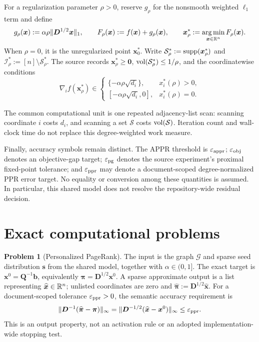 \documentclass[11pt]{article}
\theoremstyle{definition}
\newtheorem{problem}[theorem]{Problem}
\theoremstyle{remark}
\theoremstyle{plain}
\begin{document}
For a regularization parameter $\rho>0$, reserve $g_\rho$ for the nonsmooth
weighted $\ell_1$ term and define
\begin{equation}
    g_\rho(\bm{x}):=\alpha\rho\|\bm{D}^{1/2}\bm{x}\|_1,
    \qquad
    F_\rho(\bm{x}):=f(\bm{x})+g_\rho(\bm{x}),
    \qquad
    \bm{x}_\rho^*
    :=\operatorname*{arg\,min}_{\bm{x}\in\mathbb{R}^n}F_\rho(\bm{x}).
    \label{eq:shared-rppr-objective}
\end{equation}
When $\rho = 0$, it is the unregularized point $\bm{x}_0^*$. Write
$\mathcal{S}_\rho^* := \operatorname{supp}(\bm{x}_\rho^*)$ and
$\mathcal{I}_\rho^* := [n]\setminus\mathcal{S}_\rho^*$.
The source records $\bm{x}_\rho^*\geq\bm{0}$,
$\operatorname{vol}(\mathcal{S}_\rho^*)\leq1/\rho$, and the coordinatewise conditions
\begin{equation}
    \nabla_i f(\bm{x}_\rho^*)
    \in
    \begin{cases}
        \{-\alpha\rho\sqrt{d_i}\}, & x_i^*(\rho)>0,\\
        [-\alpha\rho\sqrt{d_i},0], & x_i^*(\rho)=0.
    \end{cases}
    \label{eq:shared-rppr-kkt}
\end{equation}

The common computational unit is one repeated adjacency-list scan: scanning
coordinate $i$ costs $d_i$, and scanning a set $\mathcal{S}$ costs
$\operatorname{vol}(\mathcal{S})$.
Iteration count and wall-clock time do not replace this degree-weighted work
measure.

Finally, accuracy symbols remain distinct. The APPR threshold is
$\varepsilon_{\mathrm{appr}}$; $\varepsilon_{\mathrm{obj}}$ denotes an objective-gap target; $\varepsilon_{\mathrm{pg}}$ denotes the
source experiment's proximal fixed-point tolerance; and $\varepsilon_{\mathrm{ppr}}$ may denote
a document-scoped degree-normalized PPR error target.
No equality or conversion among these quantities is assumed. In particular,
this shared model does not resolve the repository-wide residual decision.


\section{Exact computational problems}
\label{sec:problem-definitions-problems}

\begin{problem}[Personalized PageRank]
\label{prob:problem-definitions-ppr}
The input is the graph $\mathcal{G}$ and sparse seed distribution $\bm{s}$
from the shared model, together with $\alpha\in(0,1]$. The exact target is
$\bm{x}^0=\bm{Q}^{-1}\bm{b}$, equivalently
$\bm{\pi}=\bm{D}^{1/2}\bm{x}^0$. A sparse approximate output is a list
representing $\widehat{\bm{x}}\in\mathbb{R}^n$; unlisted coordinates are zero and
$\widehat{\bm{\pi}}:=\bm{D}^{1/2}\widehat{\bm{x}}$. For a
document-scoped tolerance $\varepsilon_{\mathrm{ppr}}>0$, the semantic accuracy requirement is
\begin{equation}
    \lVert\bm{D}^{-1}
      (\widehat{\bm{\pi}}-\bm{\pi})\rVert_\infty
    =
    \lVert\bm{D}^{-1/2}
      (\widehat{\bm{x}}-\bm{x}^0)\rVert_\infty
    \leq \varepsilon_{\mathrm{ppr}}.
    \label{eq:problem-definitions-semantic-ppr}
\end{equation}
This is an output property, not an activation rule or an adopted
implementation-wide stopping test.
\end{problem}
\end{document}
